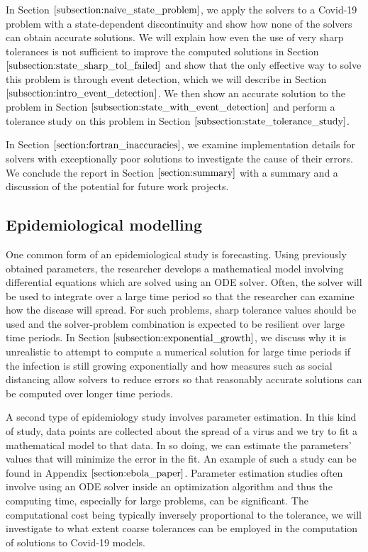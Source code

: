 In Section $\ref{subsection:naive_state_problem}$, we apply the solvers to a Covid-19 problem with a state-dependent discontinuity and show how none of the solvers can obtain accurate solutions. We will explain how even the use of very sharp tolerances is not sufficient to improve the computed solutions in Section $\ref{subsection:state_sharp_tol_failed}$ and show that the only effective way to solve this problem is through event detection, which we will describe in Section $\ref{subsection:intro_event_detection}$. We then show an accurate solution to the problem in Section $\ref{subsection:state_with_event_detection}$ and perform a tolerance study on this problem in Section $\ref{subsection:state_tolerance_study}$.

In Section $\ref{section:fortran_inaccuracies}$, we examine implementation details for solvers with exceptionally poor solutions to investigate the cause of their errors. We conclude the report in Section $\ref{section:summary}$ with a summary and a discussion of the potential for future work projects.

\subsection{Epidemiological modelling}
\label{subsection:research_papers}
One common form of an epidemiological study is forecasting. Using previously obtained parameters, the researcher develops a mathematical model involving differential equations which are solved using an ODE solver. Often, the solver will be used to integrate over a large time period so that the researcher can examine how the disease will spread. For such problems, sharp tolerance values should be used and the solver-problem combination is expected to be resilient over large time periods. In Section $\ref{subsection:exponential_growth}$, we discuss why it is unrealistic to attempt to compute a numerical solution for large time periods if the infection is still growing exponentially and how measures such as social distancing allow solvers to reduce errors so that reasonably accurate solutions can be computed over longer time periods.

A second type of epidemiology study involves parameter estimation. In this kind of study, data points are collected about the spread of a virus and we try to fit a mathematical model to that data. In so doing, we can estimate the parameters’ values that will minimize the error in the fit. An example of such a study can be found in Appendix $\ref{section:ebola_paper}$. Parameter estimation studies often involve using an ODE solver inside an optimization algorithm and thus the computing time, especially for large problems, can be significant. The computational cost being typically inversely proportional to the tolerance, we will investigate to what extent coarse tolerances can be employed in the computation of solutions to Covid-19 models.

